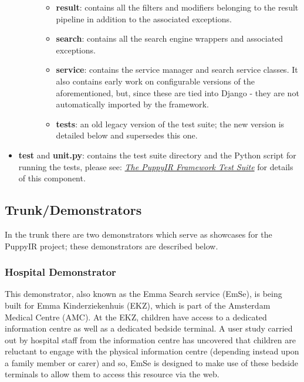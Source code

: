 \documentclass[letterpaper,10pt,english]{sphinxmanual}
\begin{document}
\begin{itemize}
\begin{description}
\begin{itemize}
\item {} 
\textbf{result}: contains all the filters and modifiers belonging to the result pipeline in addition to the associated exceptions.

\item {} 
\textbf{search}: contains all the search engine wrappers and associated exceptions.

\item {} 
\textbf{service}: contains the service manager and search service classes. It also contains early work on configurable versions of the aforementioned, but, since these are tied into Django - they are not automatically imported by the framework.

\item {} 
\textbf{tests}: an old legacy version of the test suite; the new version is detailed below and supersedes this one.

\end{itemize}

\end{description}

\item {} 
\textbf{test} and \textbf{unit.py}: contains the test suite directory and the Python script for running the tests, please see: {\hyperref[test-suite:the-puppyir-framework-test-suite]{\emph{The PuppyIR Framework Test Suite}}} for details of this component.

\end{itemize}


\subsection{Trunk/Demonstrators}
\label{repo:trunk-demonstrators}
In the trunk there are two demonstrators which serve as showcases for the PuppyIR project; these demonstrators are described below.


\subsubsection{Hospital Demonstrator}
\label{repo:hospital-demonstrator}
This demonstrator, also known as the Emma Search service (EmSe), is being built for Emma Kinderziekenhuis (EKZ), which is part of the Amsterdam
Medical Centre (AMC). At the EKZ, children have access to a dedicated information centre as well as a dedicated bedside terminal. A user study carried out by hospital staff from the information centre has uncovered that children are reluctant to engage with the physical information centre (depending instead upon a family member or carer) and so, EmSe is designed to make use of these bedside terminals to allow them to access this resource via the web.
\end{document}
